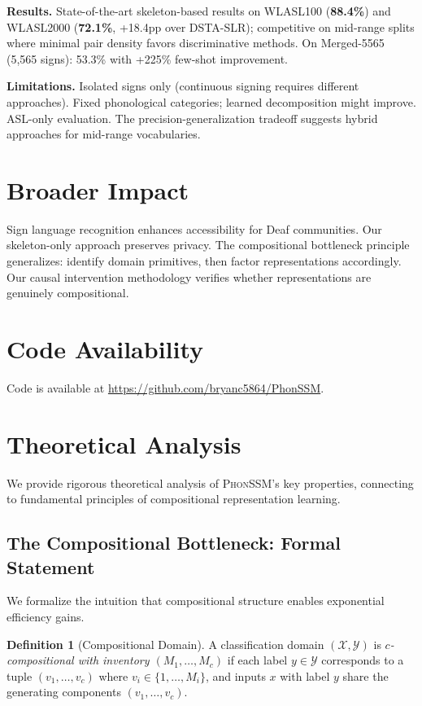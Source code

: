 \documentclass{article}
\theoremstyle{definition}
\newtheorem{definition}[theorem]{Definition}
\theoremstyle{remark}
\newcommand{\phonssm}{\textsc{PhonSSM}}
\begin{document}
\textbf{Results.} State-of-the-art skeleton-based results on WLASL100 (\textbf{88.4\%}) and WLASL2000 (\textbf{72.1\%}, +18.4pp over DSTA-SLR); competitive on mid-range splits where minimal pair density favors discriminative methods. On Merged-5565 (5,565 signs): 53.3\% with +225\% few-shot improvement.

\textbf{Limitations.} Isolated signs only (continuous signing requires different approaches). Fixed phonological categories; learned decomposition might improve. ASL-only evaluation. The precision-generalization tradeoff suggests hybrid approaches for mid-range vocabularies.

\section*{Broader Impact}

Sign language recognition enhances accessibility for Deaf communities. Our skeleton-only approach preserves privacy. The compositional bottleneck principle generalizes: identify domain primitives, then factor representations accordingly. Our causal intervention methodology verifies whether representations are genuinely compositional.




\newpage
\appendix
\section{Code Availability}
Code is available at \url{https://github.com/bryanc5864/PhonSSM}.

\section{Theoretical Analysis}
\label{app:theory}

We provide rigorous theoretical analysis of \phonssm{}'s key properties, connecting to fundamental principles of compositional representation learning.

\subsection{The Compositional Bottleneck: Formal Statement}

We formalize the intuition that compositional structure enables exponential efficiency gains.

\begin{definition}[Compositional Domain]
A classification domain $(\mathcal{X}, \mathcal{Y})$ is \textit{$c$-compositional with inventory $(M_1, \ldots, M_c)$} if each label $y \in \mathcal{Y}$ corresponds to a tuple $(v_1, \ldots, v_c)$ where $v_i \in \{1, \ldots, M_i\}$, and inputs $x$ with label $y$ share the generating components $(v_1, \ldots, v_c)$.
\end{definition}
\end{document}
